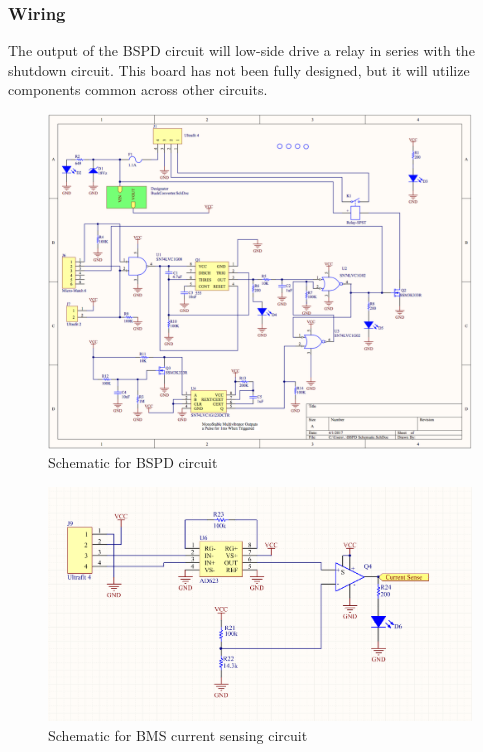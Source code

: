 \documentclass{article}
\begin{document}
\subsubsection{Wiring}

The output of the BSPD circuit will low-side drive a relay in series with the shutdown circuit. This board has not been fully designed, but it will utilize components common across other circuits.

  \begin{figure}[H]
        \centering
        \includegraphics[width=\textwidth]{bspd_schematic_rev2.png}
        \caption{Schematic for BSPD circuit}
        \label{fig:bspd_schematic}
  \end{figure}

  \begin{figure}[H]
        \centering
        \includegraphics[width=\textwidth]{BMS_current_sense_schematic.png}
        \caption{Schematic for BMS current sensing circuit}
        \label{fig:bms_current_sense_schematic}
  \end{figure}
\end{document}
